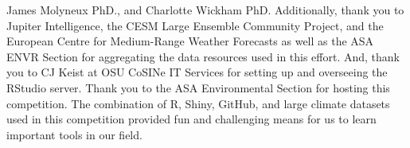 \documentclass[10pt,letterpaper]{article}
\begin{document}
James Molyneux PhD., and Charlotte Wickham PhD. Additionally, thank you to Jupiter Intelligence, the CESM Large Ensemble Community Project, and the European Centre for Medium-Range Weather Forecasts as well as the ASA ENVR Section for aggregating the data resources used in this effort. And, thank you to CJ Keist at OSU CoSINe IT Services for setting up and overseeing the RStudio server.
Thank you to the ASA Environmental Section for hosting this competition. The combination of R, Shiny, GitHub, and large climate datasets used in this competition provided fun and challenging means for us to learn important tools in our field.





\nolinenumbers

%
%
%


%
%
%
\end{document}
